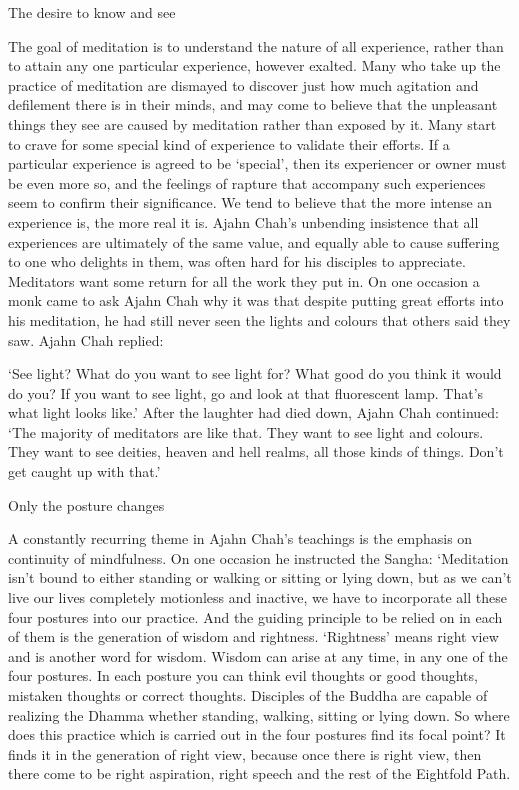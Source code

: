 The desire to know and see

The goal of meditation is to understand the nature of all experience,
rather than to attain any one particular experience, however exalted.
Many who take up the practice of meditation are dismayed to discover
just how much agitation and defilement there is in their minds, and may
come to believe that the unpleasant things they see are caused by
meditation rather than exposed by it. Many start to crave for some
special kind of experience to validate their efforts. If a particular
experience is agreed to be `special', then its experiencer or owner must
be even more so, and the feelings of rapture that accompany such
experiences seem to confirm their significance. We tend to believe that
the more intense an experience is, the more real it is. Ajahn Chah's
unbending insistence that all experiences are ultimately of the same
value, and equally able to cause suffering to one who delights in them,
was often hard for his disciples to appreciate. Meditators want some
return for all the work they put in. On one occasion a monk came to ask
Ajahn Chah why it was that despite putting great efforts into his
meditation, he had still never seen the lights and colours that others
said they saw. Ajahn Chah replied:

`See light? What do you want to see light for? What good do you think it
would do you? If you want to see light, go and look at that fluorescent
lamp. That's what light looks like.' After the laughter had died down,
Ajahn Chah continued: `The majority of meditators are like that. They
want to see light and colours. They want to see deities, heaven and hell
realms, all those kinds of things. Don't get caught up with that.'

Only the posture changes

A constantly recurring theme in Ajahn Chah's teachings is the emphasis
on continuity of mindfulness. On one occasion he instructed the Sangha:
`Meditation isn't bound to either standing or walking or sitting or
lying down, but as we can't live our lives completely motionless and
inactive, we have to incorporate all these four postures into our
practice. And the guiding principle to be relied on in each of them is
the generation of wisdom and rightness. `Rightness' means right view and
is another word for wisdom. Wisdom can arise at any time, in any one of
the four postures. In each posture you can think evil thoughts or good
thoughts, mistaken thoughts or correct thoughts. Disciples of the Buddha
are capable of realizing the Dhamma whether standing, walking, sitting
or lying down. So where does this practice which is carried out in the
four postures find its focal point? It finds it in the generation of
right view, because once there is right view, then there come to be
right aspiration, right speech and the rest of the Eightfold Path.

